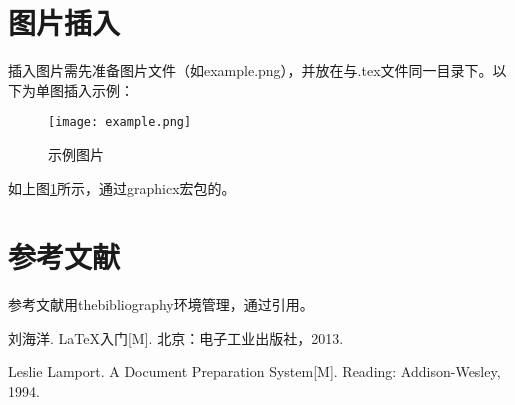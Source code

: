 \documentclass[12pt,a4paper]{article}
\begin{document}
\section{图片插入}
插入图片需先准备图片文件（如example.png），并放在与.tex文件同一目录下。以下为单图插入示例：

\begin{figure}[h]  %
    \centering  %
    \texttt{[image: example.png]}  %
    \caption{示例图片}  %
    \label{fig:example}  %
\end{figure}

如上图\ref{fig:example}所示，通过graphicx宏包的。

\section{参考文献}
参考文献用thebibliography环境管理，通过\cite{key}引用。

\begin{thebibliography}{9}  %
    刘海洋. LaTeX入门[M]. 北京：电子工业出版社，2013.
    
    Leslie Lamport. A Document Preparation System[M]. Reading: Addison-Wesley, 1994.
\end{thebibliography}

\end{document}
